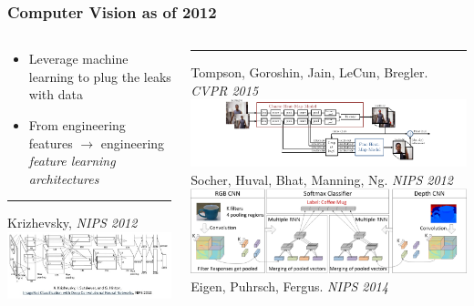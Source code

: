 \documentclass{beamer}
\begin{document}
\begin{frame}
\frametitle{Computer Vision as of 2012}
\begin{columns}[T] %
\begin{column}{.4\textwidth}
\begin{itemize} 
\item{Leverage machine learning to plug the leaks with data}
\item From engineering features $\rightarrow$ engineering \emph{feature learning architectures}   
\end{itemize} 
\centering
\color{blue}\rule{\linewidth}{2pt} \tiny{Krizhevsky, \emph{NIPS 2012}} 
\includegraphics[scale=0.25]{./Figures/alexNet.jpg}
\end{column}%
\hfill%
\begin{column}{.6\textwidth}
\color{blue}\rule{\linewidth}{2pt}
\tiny{Tompson, Goroshin, Jain, LeCun, Bregler. \emph{CVPR 2015}}
\centering
\includegraphics[scale=0.4]{./Figures/network2.pdf} \\
\tiny{Socher, Huval, Bhat, Manning, Ng. \emph{NIPS 2012}}   
\includegraphics[scale=0.15]{./Figures/socher.png} \\
\tiny{Eigen, Puhrsch, Fergus. \emph{NIPS 2014}} \\

\end{column}
\end{columns}
\end{frame}
\end{document}
